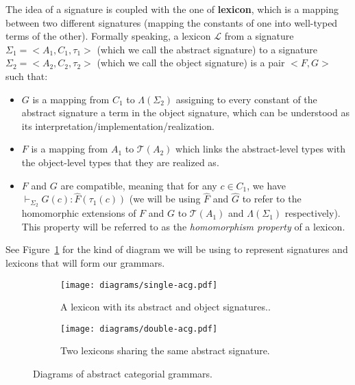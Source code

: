 The idea of a signature is coupled with the one of \textbf{lexicon},
which is a mapping between two different signatures (mapping the
constants of one into well-typed terms of the other). Formally speaking,
a lexicon $\mathcal{L}$ from a signature $\Sigma_1 = \mathopen{<}A_1,
C_1, \tau_1\mathclose{>}$ (which we call the abstract signature) to a
signature $\Sigma_2 = \mathopen{<}A_2, C_2, \tau_2\mathclose{>}$ (which
we call the object signature) is a pair $\mathopen{<}F, G\mathclose{>}$
such that:

\begin{itemize}
\item $G$ is a mapping from $C_1$ to $\Lambda(\Sigma_2)$ assigning to
  every constant of the abstract signature a term in the object
  signature, which can be understood as its
  interpretation/implementation/realization.
\item $F$ is a mapping from $A_1$ to $\mathcal{T}(A_2)$ which links the
  abstract-level types with the object-level types that they are
  realized as.
\item $F$ and $G$ are compatible, meaning that for any $c \in C_1$, we
  have $\vdash_{\Sigma_2} G(c) : \hat{F}(\tau_1(c))$ (we will be using
  $\hat{F}$ and $\hat{G}$ to refer to the homomorphic extensions of $F$
  and $G$ to $\mathcal{T}(A_1)$ and $\Lambda(\Sigma_1)$
  respectively). This property will be referred to as the
  \emph{homomorphism property} of a lexicon.
\end{itemize}

See Figure~\ref{fig:single-acg} for the kind of diagram we will be using
to represent signatures and lexicons that will form our grammars.

\begin{figure}
  \centering
  \begin{subfigure}[b]{0.4\textwidth}
    \centering
    \texttt{[image: diagrams/single-acg.pdf]}
    \caption{{\label{fig:single-acg} A lexicon with its abstract
        and object signatures..}}
  \end{subfigure}
  \qquad
  \begin{subfigure}[b]{0.4\textwidth}
    \centering
    \texttt{[image: diagrams/double-acg.pdf]}
    \caption{{\label{fig:double-acg} Two lexicons sharing the same
        abstract signature.}}
  \end{subfigure}
  \caption{Diagrams of abstract categorial grammars.}
\end{figure}

